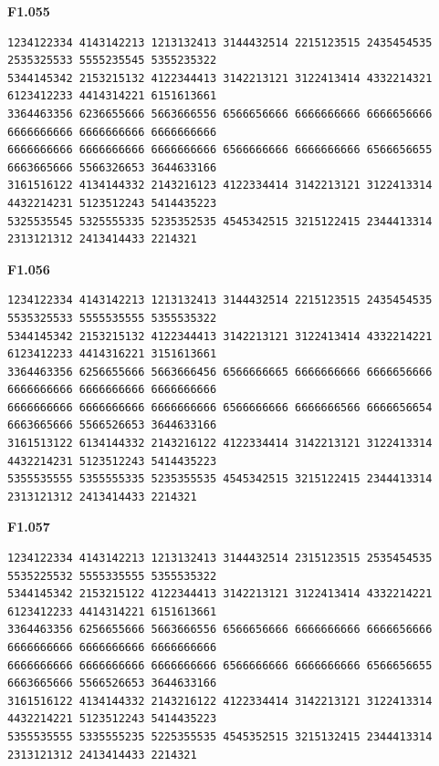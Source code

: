 \noindent\begin{minipage}{\linewidth}\textbf{F1.055}
\begin{lstlisting}
1234122334 4143142213 1213132413 3144432514 2215123515 2435454535 2535325533 5555235545 5355235322
5344145342 2153215132 4122344413 3142213121 3122413414 4332214321 6123412233 4414314221 6151613661
3364463356 6236655666 5663666556 6566656666 6666666666 6666656666 6666666666 6666666666 6666666666
6666666666 6666666666 6666666666 6566666666 6666666666 6566656655 6663665666 5566326653 3644633166
3161516122 4134144332 2143216123 4122334414 3142213121 3122413314 4432214231 5123512243 5414435223
5325535545 5325555335 5235352535 4545342515 3215122415 2344413314 2313121312 2413414433 2214321
\end{lstlisting}
\end{minipage}\par\smallskip

\noindent\begin{minipage}{\linewidth}\textbf{F1.056}
\begin{lstlisting}
1234122334 4143142213 1213132413 3144432514 2215123515 2435454535 5535325533 5555535555 5355535322
5344145342 2153215132 4122344413 3142213121 3122413414 4332214221 6123412233 4414316221 3151613661
3364463356 6256655666 5663666456 6566666665 6666666666 6666656666 6666666666 6666666666 6666666666
6666666666 6666666666 6666666666 6566666666 6666666566 6666656654 6663665666 5566526653 3644633166
3161513122 6134144332 2143216122 4122334414 3142213121 3122413314 4432214231 5123512243 5414435223
5355535555 5355555335 5235355535 4545342515 3215122415 2344413314 2313121312 2413414433 2214321
\end{lstlisting}
\end{minipage}\par\smallskip

\noindent\begin{minipage}{\linewidth}\textbf{F1.057}
\begin{lstlisting}
1234122334 4143142213 1213132413 3144432514 2315123515 2535454535 5535225532 5555335555 5355535322
5344145342 2153215122 4122344413 3142213121 3122413414 4332214221 6123412233 4414314221 6151613661
3364463356 6256655666 5663666556 6566656666 6666666666 6666656666 6666666666 6666666666 6666666666
6666666666 6666666666 6666666666 6566666666 6666666666 6566656655 6663665666 5566526653 3644633166
3161516122 4134144332 2143216122 4122334414 3142213121 3122413314 4432214221 5123512243 5414435223
5355535555 5335555235 5225355535 4545352515 3215132415 2344413314 2313121312 2413414433 2214321
\end{lstlisting}
\end{minipage}\par\smallskip

